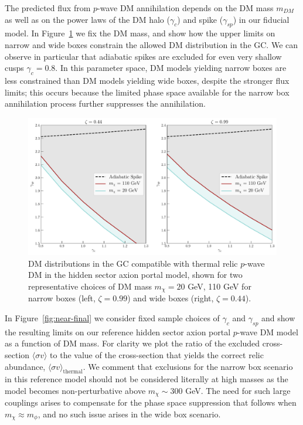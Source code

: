 The predicted flux from $p$-wave DM annihilation depends on the DM mass $m_{DM}$ as well as on the power laws of the DM halo ($\gamma_c$) and spike ($\gamma_{sp}$) in our fiducial model.  In Figure~\ref{fig:final_interp} we fix the DM mass, and show how the upper limits on narrow and wide boxes constrain the allowed DM distribution in the GC.  We can observe in particular that adiabatic spikes are excluded for even very shallow cusps $\gamma_c = 0.8$.  In this parameter space, DM models yielding narrow boxes are less constrained than DM models yielding wide boxes, despite the stronger flux limits; this occurs because the limited phase space available for the narrow box annihilation process further suppresses the annihilation.




\begin{figure}[ht] 
\begin{center}
\includegraphics[width=0.9\columnwidth]{figures/final_interpretation.pdf}
\noindent
\caption{ 
\label{fig:final_interp}
DM distributions in the GC compatible with thermal relic $p$-wave DM in the hidden sector axion portal model, shown for two representative choices of DM mass $m_\chi = 20$ GeV, 110 GeV for narrow boxes (left, $\zeta=0.99$) and wide boxes (right, $\zeta = 0.44$).
}
\end{center}
\end{figure}

In Figure~\ref{fig:near-final} we consider fixed sample choices of $\gamma_c$ and $\gamma_{sp}$ and show the resulting limits on our reference hidden sector axion portal $p$-wave DM model as a function of DM mass.  For clarity we plot the ratio of the excluded cross-section $\langle\sigma v\rangle$ to the value of the cross-section that yields the correct relic abundance, $\langle\sigma v\rangle_{\mathrm{thermal}}$.  We comment that exclusions for the narrow box scenario in this reference model should not be considered literally at high masses as the model becomes non-perturbative above $m_\chi\sim 300$ GeV.  The need for such large couplings arises to compensate for the phase space suppression that follows when $m_\chi\approx m_\phi$, and no such issue arises in the wide box scenario.


